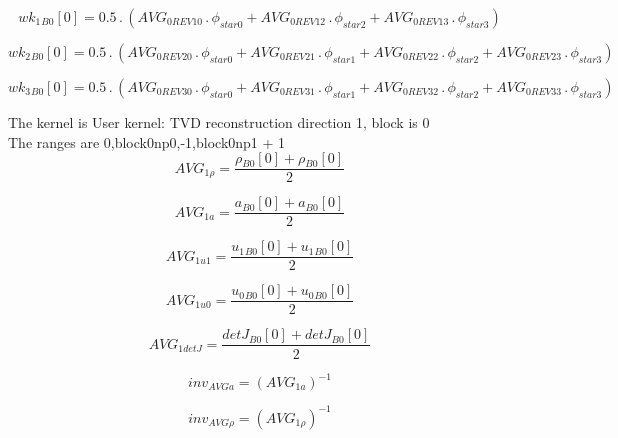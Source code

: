 \documentclass{article}
\begin{document}
\begin{dmath}{wk_{1}{_{B0}}}[{0}] = 0.5 \,.\, \left(AVG_{0 REV 10} \,.\, \phi_{star 0} + AVG_{0 REV 12} \,.\, \phi_{star 2} + AVG_{0 REV 13} \,.\, \phi_{star 3}\right)\end{dmath}

\begin{dmath}{wk_{2}{_{B0}}}[{0}] = 0.5 \,.\, \left(AVG_{0 REV 20} \,.\, \phi_{star 0} + AVG_{0 REV 21} \,.\, \phi_{star 1} + AVG_{0 REV 22} \,.\, \phi_{star 2} + AVG_{0 REV 23} \,.\, \phi_{star 3}\right)\end{dmath}

\begin{dmath}{wk_{3}{_{B0}}}[{0}] = 0.5 \,.\, \left(AVG_{0 REV 30} \,.\, \phi_{star 0} + AVG_{0 REV 31} \,.\, \phi_{star 1} + AVG_{0 REV 32} \,.\, \phi_{star 2} + AVG_{0 REV 33} \,.\, \phi_{star 3}\right)\end{dmath}

\noindent The kernel is User kernel: TVD reconstruction direction 1, block is 0\\\noindent The ranges are 0,block0np0,-1,block0np1 + 1\\\begin{dmath}AVG_{1 \rho} = \frac{{\rho{_{B0}}}[{0}] + {\rho{_{B0}}}[{0}]}{2}\end{dmath}

\begin{dmath}AVG_{1 a} = \frac{{a{_{B0}}}[{0}] + {a{_{B0}}}[{0}]}{2}\end{dmath}

\begin{dmath}AVG_{1 u1} = \frac{{u_{1}{_{B0}}}[{0}] + {u_{1}{_{B0}}}[{0}]}{2}\end{dmath}

\begin{dmath}AVG_{1 u0} = \frac{{u_{0}{_{B0}}}[{0}] + {u_{0}{_{B0}}}[{0}]}{2}\end{dmath}

\begin{dmath}AVG_{1 detJ} = \frac{{detJ{_{B0}}}[{0}] + {detJ{_{B0}}}[{0}]}{2}\end{dmath}

\begin{dmath}inv_{AVG a} = \left(AVG_{1 a} \right)^{-1}\end{dmath}

\begin{dmath}inv_{AVG \rho} = \left(AVG_{1 \rho} \right)^{-1}\end{dmath}
\end{document}
